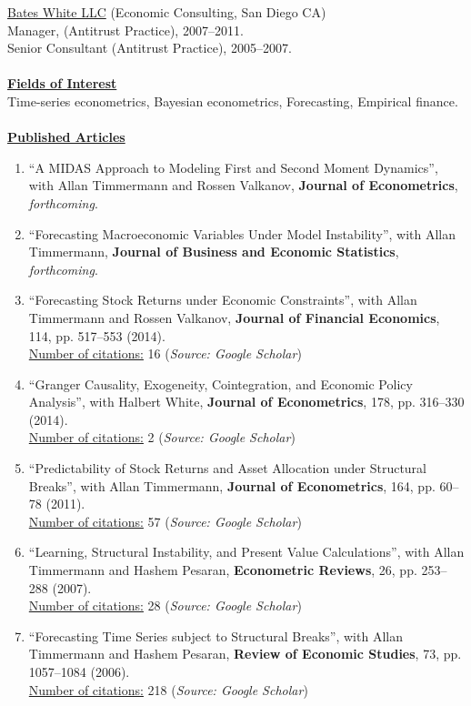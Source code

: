 \documentclass[12pt]{article}
\begin{document}
\underline{Bates White LLC} (Economic Consulting, San Diego CA)\\
Manager, (Antitrust Practice), 2007--2011.\\
Senior Consultant (Antitrust Practice), 2005--2007. \\ \\
\underline{\textbf{Fields of Interest}}\\
Time-series econometrics, Bayesian econometrics, Forecasting, Empirical finance.\\ \\
\underline{\textbf{Published Articles}}
\begin{enumerate}	
	\item ``A MIDAS Approach to Modeling First and Second Moment Dynamics'', with Allan Timmermann and Rossen Valkanov, \textbf{Journal of Econometrics}, \textit{forthcoming}.
	
  \item ``Forecasting Macroeconomic Variables Under Model Instability'', with Allan Timmermann, \textbf{Journal of Business and Economic Statistics},  \textit{forthcoming}. 
		
	\item ``Forecasting Stock Returns under Economic Constraints'', with Allan Timmermann and Rossen Valkanov, \textbf{Journal of Financial Economics}, 114, pp. 517--553 (2014). \\
	\underline{Number of citations:} 16 (\emph{Source: Google Scholar})
	
	\item ``Granger Causality, Exogeneity, Cointegration, and Economic Policy Analysis'', with Halbert White, \textbf{Journal of Econometrics}, 178, pp. 316--330 (2014). \\
	\underline{Number of citations:} 2 (\emph{Source: Google Scholar})
	
	\item ``Predictability of Stock Returns and Asset Allocation under Structural Breaks'', with Allan Timmermann, \textbf{Journal of Econometrics}, 164, pp. 60--78 (2011). \\
	\underline{Number of citations:} 57 (\emph{Source: Google Scholar})
	
	\item ``Learning, Structural Instability, and Present Value Calculations'', with Allan Timmermann and Hashem Pesaran, \textbf{Econometric Reviews}, 26, pp. 253--288 (2007). \\
	\underline{Number of citations:} 28 (\emph{Source: Google Scholar})

	\item ``Forecasting Time Series subject to Structural Breaks'', with Allan Timmermann and Hashem Pesaran, \textbf{Review of Economic Studies}, 73, pp. 1057--1084 (2006). \\
	\underline{Number of citations:} 218 (\emph{Source: Google Scholar})

    \setcounter{enumTemp}{\theenumi}
 \end{enumerate}
\end{document}
